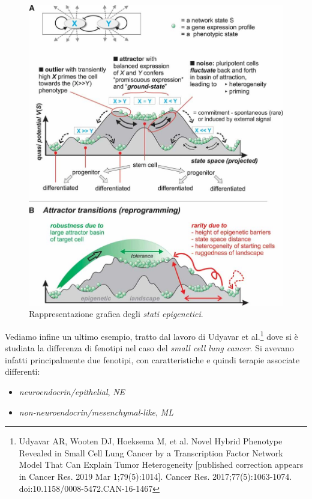 \documentclass[a4paper,12pt, oneside]{book}
\begin{document}
\begin{figure}
  \centering
  \includegraphics[scale = 0.30]{img/exbool4.jpg}
  \caption{Rappresentazione grafica degli \textit{stati epigenetici}.}  
  \label{fig:exbool4}
\end{figure}
\noindent
Vediamo infine un ultimo esempio, tratto dal lavoro di Udyavar et
al.\footnote{Udyavar AR, Wooten DJ, Hoeksema M, et al. Novel Hybrid Phenotype
  Revealed in Small Cell Lung Cancer by a Transcription Factor Network Model
  That Can Explain Tumor Heterogeneity [published correction appears in Cancer
  Res. 2019 Mar 1;79(5):1014]. Cancer
  Res. 2017;77(5):1063-1074. doi:10.1158/0008-5472.CAN-16-1467} dove si è
studiata la differenza di fenotipi nel caso del \textit{small cell lung
  cancer}. Si avevano infatti principalmente due fenotipi, con caratteristiche e
quindi terapie associate differenti:
\begin{itemize}
  \item \textit{neuroendocrin/epithelial}, \textit{NE}
  \item \textit{non-neuroendocrin/mesenchymal-like}, \textit{ML}
\end{itemize}
\end{document}
